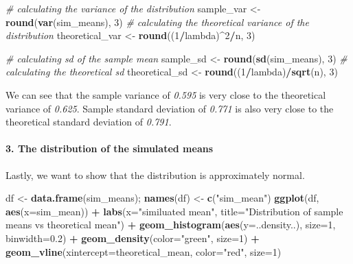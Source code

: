 \documentclass[]{article}
\newenvironment{Shaded}{\begin{snugshade}}{\end{snugshade}}
\newcommand{\CommentTok}[1]{\textcolor[rgb]{0.56,0.35,0.01}{\textit{#1}}}
\newcommand{\DataTypeTok}[1]{\textcolor[rgb]{0.13,0.29,0.53}{#1}}
\newcommand{\DecValTok}[1]{\textcolor[rgb]{0.00,0.00,0.81}{#1}}
\newcommand{\FloatTok}[1]{\textcolor[rgb]{0.00,0.00,0.81}{#1}}
\newcommand{\KeywordTok}[1]{\textcolor[rgb]{0.13,0.29,0.53}{\textbf{#1}}}
\newcommand{\NormalTok}[1]{#1}
\newcommand{\OperatorTok}[1]{\textcolor[rgb]{0.81,0.36,0.00}{\textbf{#1}}}
\newcommand{\StringTok}[1]{\textcolor[rgb]{0.31,0.60,0.02}{#1}}
\let\oldparagraph\paragraph
\renewcommand{\paragraph}[1]{\oldparagraph{#1}\mbox{}}
\begin{document}
\begin{Shaded}
\begin{Highlighting}[]
\CommentTok{# calculating the variance of the distribution}
\NormalTok{sample_var <-}\StringTok{ }\KeywordTok{round}\NormalTok{(}\KeywordTok{var}\NormalTok{(sim_means), }\DecValTok{3}\NormalTok{)}
\CommentTok{# calculating the theoretical variance of the distribution}
\NormalTok{theoretical_var <-}\StringTok{ }\KeywordTok{round}\NormalTok{((}\DecValTok{1}\OperatorTok{/}\NormalTok{lambda)}\OperatorTok{^}\DecValTok{2}\OperatorTok{/}\NormalTok{n, }\DecValTok{3}\NormalTok{)}

\CommentTok{# calculating sd of the sample mean}
\NormalTok{sample_sd <-}\StringTok{ }\KeywordTok{round}\NormalTok{(}\KeywordTok{sd}\NormalTok{(sim_means), }\DecValTok{3}\NormalTok{)}
\CommentTok{# calculating the theoretical sd}
\NormalTok{theoretical_sd <-}\StringTok{ }\KeywordTok{round}\NormalTok{((}\DecValTok{1}\OperatorTok{/}\NormalTok{lambda)}\OperatorTok{/}\KeywordTok{sqrt}\NormalTok{(n), }\DecValTok{3}\NormalTok{)}
\end{Highlighting}
\end{Shaded}

We can see that the sample variance of \emph{0.595} is very close to the
theoretical variance of \emph{0.625}. Sample standard deviation of
\emph{0.771} is also very close to the theoretical standard deviation of
\emph{0.791}.

\hypertarget{the-distribution-of-the-simulated-means}{%
\paragraph{3. The distribution of the simulated
means}\label{the-distribution-of-the-simulated-means}}

Lastly, we want to show that the distribution is approximately normal.

\begin{Shaded}
\begin{Highlighting}[]
\NormalTok{df <-}\StringTok{ }\KeywordTok{data.frame}\NormalTok{(sim_means); }\KeywordTok{names}\NormalTok{(df) <-}\StringTok{ }\KeywordTok{c}\NormalTok{(}\StringTok{"sim_mean"}\NormalTok{)}
\KeywordTok{ggplot}\NormalTok{(df, }\KeywordTok{aes}\NormalTok{(}\DataTypeTok{x=}\NormalTok{sim_mean)) }\OperatorTok{+}
\StringTok{       }\KeywordTok{labs}\NormalTok{(}\DataTypeTok{x=}\StringTok{"similuated mean"}\NormalTok{, }\DataTypeTok{title=}\StringTok{"Distribution of sample means vs theoretical mean"}\NormalTok{) }\OperatorTok{+}
\StringTok{       }\KeywordTok{geom_histogram}\NormalTok{(}\KeywordTok{aes}\NormalTok{(}\DataTypeTok{y=}\NormalTok{..density..), }\DataTypeTok{size=}\DecValTok{1}\NormalTok{, }\DataTypeTok{binwidth=}\FloatTok{0.2}\NormalTok{) }\OperatorTok{+}\StringTok{ }
\StringTok{       }\KeywordTok{geom_density}\NormalTok{(}\DataTypeTok{color=}\StringTok{"green"}\NormalTok{, }\DataTypeTok{size=}\DecValTok{1}\NormalTok{) }\OperatorTok{+}
\StringTok{       }\KeywordTok{geom_vline}\NormalTok{(}\DataTypeTok{xintercept=}\NormalTok{theoretical_mean, }\DataTypeTok{color=}\StringTok{"red"}\NormalTok{, }\DataTypeTok{size=}\DecValTok{1}\NormalTok{)}
\end{Highlighting}
\end{Shaded}
\end{document}

